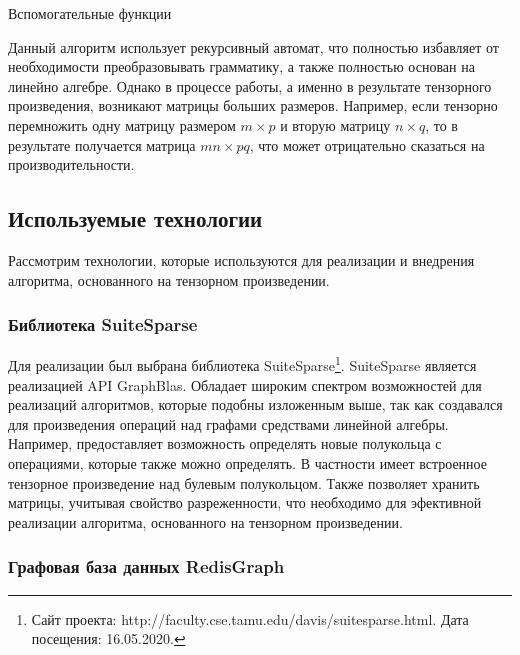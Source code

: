\documentclass[14pt]{matmex-diploma}
\theoremstyle{definition}
\begin{document}
\begin{algorithm}[H]
\begin{algorithmic}[1]
\caption{Вспомогательные функции}
\label{tensor:cfpq:help}
    \State {}
\EndFunction
{}
    \State {}
\EndFunction
\end{algorithmic}
\end{algorithm}

Данный алгоритм использует рекурсивный автомат, что полностью избавляет от необходимости преобразовывать грамматику, а также полностью основан на линейно алгебре. Однако в процессе работы, а именно в результате тензорного произведения, возникают матрицы больших размеров. Например, если тензорно перемножить одну матрицу размером $m \times p$ и вторую матрицу $n \times q$, то в результате получается матрица $mn \times pq$, что может отрицательно сказаться на производительности.
\subsection{Используемые технологии}
Рассмотрим технологии, которые используются для реализации и внедрения алгоритма, основанного на тензорном произведении.
\subsubsection{Библиотека SuiteSparse}

Для реализации был выбрана библиотека SuiteSparse\footnote{Сайт проекта: http://faculty.cse.tamu.edu/davis/suitesparse.html. Дата посещения: 16.05.2020.}. SuiteSparse является реализацией API GraphBlas. Обладает широким спектром возможностей \cite{MathInGB} для реализаций алгоритмов, которые подобны изложенным выше, так как создавался для произведения операций над графами средствами линейной алгебры. Например, предоставляет возможность определять новые полукольца с операциями, которые также можно определять. В частности имеет встроенное тензорное произведение над булевым полукольцом. Также позволяет хранить матрицы, учитывая свойство разреженности, что необходимо для эфективной реализации алгоритма, основанного на тензорном произведении.

\subsubsection{Графовая база данных RedisGraph}
\end{document}
